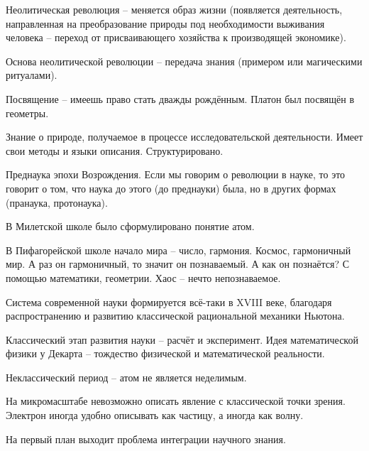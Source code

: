 \documentclass[main.tex]{subfiles}
\begin{document}



Неолитическая революция -- меняется образ жизни (появляется деятельность, направленная на преобразование природы под необходимости выживания человека -- переход от присваивающего хозяйства к производящей экономике).

Основа неолитической революции -- передача знания (примером или магическими ритуалами).

Посвящение -- имеешь право стать дважды рождённым.
Платон был посвящён в геометры.


Знание о природе, получаемое в процессе исследовательской деятельности.
Имеет свои методы и языки описания.
Структурировано.



Преднаука эпохи Возрождения.
Если мы говорим о революции в науке, то это говорит о том, что наука до этого (до преднауки) была, но в других формах (пранаука, протонаука).

В Милетской школе было сформулировано понятие атом.

В Пифагорейской школе начало мира -- число, гармония.
Космос, гармоничный мир.
А раз он гармоничный, то значит он познаваемый.
А как он познаётся?
С помощью математики, геометрии.
Хаос -- нечто непознаваемое.



Система современной науки формируется всё-таки в XVIII веке, благодаря распространению и развитию классической рациональной механики Ньютона.

Классический этап развития науки -- расчёт и эксперимент.
Идея математической физики у Декарта -- тождество физической и математической реальности.

Неклассический период -- атом не является неделимым.

На микромасштабе невозможно описать явление с классической точки зрения.
Электрон иногда удобно описывать как частицу, а иногда как волну.


На первый план выходит проблема интеграции научного знания.
\end{document}
